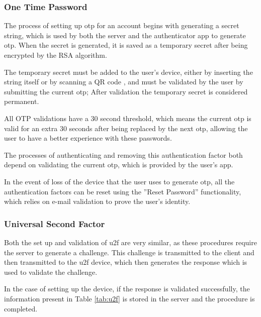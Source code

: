 \subsubsection*{One Time Password}

The process of setting up \acrfull{otp} for an account begins with generating a secret string, which is used by both the server and the authenticator app to generate \acrshort{otp}. When the secret is generated, it is saved as a temporary secret after being encrypted by the RSA algorithm.

The temporary secret must be added to the user's device, either by inserting the string itself or by scanning a QR code \cite{qr}, and must be validated by the user by submitting the current \acrshort{otp}; After validation the temporary secret is considered permanent.

All OTP validations have a 30 second threshold, which means the current \acrshort{otp} is valid for an extra 30 seconds after being replaced by the next \acrshort{otp}, allowing the user to have a better experience with these passwords.

The processes of authenticating and removing this authentication factor both depend on validating the current \acrshort{otp}, which is provided by the user's app.

In the event of loss of the device that the user uses to generate \acrshort{otp}, all the authentication factors can be reset using the ''Reset Password'' functionality, which relies on e-mail validation to prove the user's identity.

\subsubsection*{Universal Second Factor}

Both the set up and validation of \acrfull{u2f} are very similar, as these procedures require the server to generate a challenge.
This challenge is transmitted to the client and then transmitted to the \acrshort{u2f} device, which then generates the response which is used to validate the challenge.

In the case of setting up the device, if the response is validated successfully, the information present in Table \ref{tab:u2f} is stored in the server and the procedure is completed.

\pagebreak

